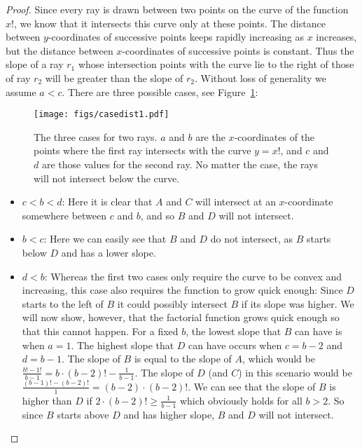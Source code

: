 \documentclass[]{llncs}
\begin{document}
\begin {proof}
Since every ray is drawn between two points on the curve of the function $x!$, we know that it intersects this curve only at these points.
The distance between $y$-coordinates of successive points keeps rapidly increasing as $x$ increases, but the distance between $x$-coordinates of successive points is constant.
Thus the slope of a ray $r_1$ whose intersection points with the curve lie to the right of those of ray $r_2$ will be greater than the slope of $r_2$.
Without loss of generality we assume $a < c$. There are three possible cases, see Figure~\ref{fig:casedistinction}:
  \begin{figure}
      \centering
      \texttt{[image: figs/casedist1.pdf]}
      \caption{The three cases for two rays. $a$ and $b$ are the $x$-coordinates of the points where the first ray intersects with the curve $y=x!$, and $c$ and $d$ are those values for the second ray. No matter the case, the rays will not intersect below the curve. %
      }
      \label{fig:casedistinction}
  \end{figure}
  \begin{itemize}
   \item $c < b < d$: Here it is clear that $A$ and $C$ will intersect at an $x$-coordinate somewhere between $c$ and $b$, and so $B$ and $D$ will not intersect.
  \item $b < c$: Here we can easily see that $B$ and $D$ do not intersect, as $B$ starts below $D$ and has a lower slope.
  
  \item $d < b$: Whereas the first two cases only require the curve to be convex and increasing, this case also requires the function to grow quick enough: Since $D$ starts to the left of $B$ it could possibly intersect $B$ if its slope was higher. We will now show, however, that the factorial function grows quick enough so that this cannot happen.
  For a fixed $b$, the lowest slope that $B$ can have is when $a=1$. The highest slope that $D$ can have occurs when $c=b-2$ and $d=b-1$. The slope of $B$ is equal to the slope of $A$, which would be $\frac{b! - 1!}{b-1} = b\cdot (b-2)! - \frac{1}{b-1}$. The slope of $D$ (and $C$) in this scenario would be $\frac{(b-1)! - (b-2)!}{1} = (b-2) \cdot (b-2)!$. We can see that the slope of $B$ is higher than $D$ if $2\cdot(b-2)! \geq \frac{1}{b-1}$ which obviously holds for all $b>2$. So since $B$ starts above $D$ and has higher slope, $B$ and $D$ will not intersect.
  \end{itemize}
\end{proof}
\end{document}

